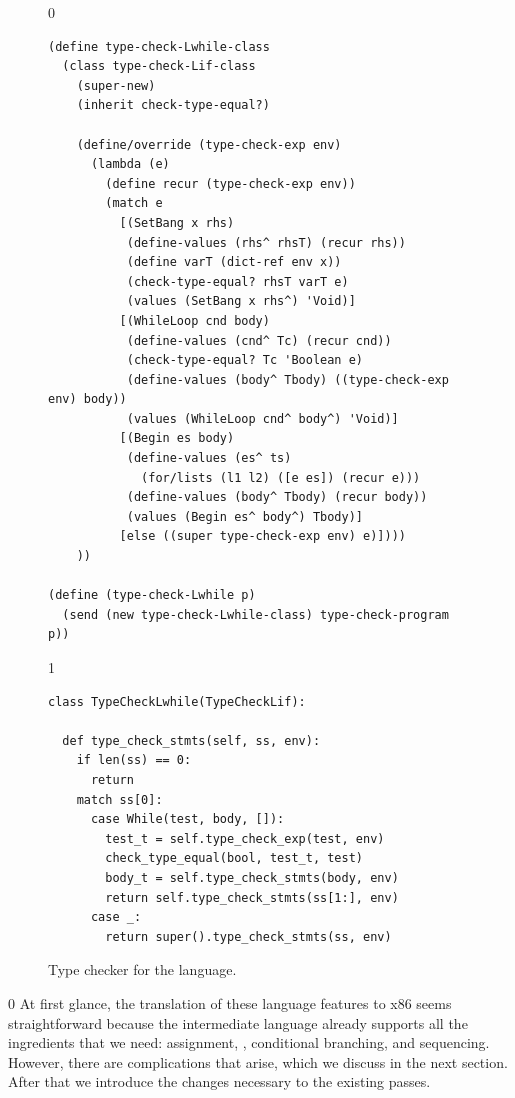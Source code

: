 \documentclass[7x10]{TimesAPriori_MIT}%
\def\racketEd{0}
\def\pythonEd{1}
\def\edition{1}
\newcommand{\pythonColor}[0]{}
\numberwithin{theorem}{chapter}
\numberwithin{definition}{chapter}
\numberwithin{equation}{chapter}
\begin{document}
\begin{figure}[tbp]
\begin{tcolorbox}[colback=white]  
{\if\edition\racketEd    
\begin{lstlisting}[basicstyle=\ttfamily\footnotesize]
(define type-check-Lwhile-class
  (class type-check-Lif-class
    (super-new)
    (inherit check-type-equal?)

    (define/override (type-check-exp env)
      (lambda (e)
        (define recur (type-check-exp env))
        (match e
          [(SetBang x rhs)
           (define-values (rhs^ rhsT) (recur rhs))
           (define varT (dict-ref env x))
           (check-type-equal? rhsT varT e)
           (values (SetBang x rhs^) 'Void)]
          [(WhileLoop cnd body)
           (define-values (cnd^ Tc) (recur cnd))
           (check-type-equal? Tc 'Boolean e)
           (define-values (body^ Tbody) ((type-check-exp env) body))
           (values (WhileLoop cnd^ body^) 'Void)]
          [(Begin es body)
           (define-values (es^ ts)
             (for/lists (l1 l2) ([e es]) (recur e)))
           (define-values (body^ Tbody) (recur body))
           (values (Begin es^ body^) Tbody)]
          [else ((super type-check-exp env) e)])))
    ))

(define (type-check-Lwhile p)
  (send (new type-check-Lwhile-class) type-check-program p))
\end{lstlisting}
\fi}
{\if\edition\pythonEd\pythonColor
\begin{lstlisting}
class TypeCheckLwhile(TypeCheckLif):

  def type_check_stmts(self, ss, env):
    if len(ss) == 0:
      return
    match ss[0]:
      case While(test, body, []):
        test_t = self.type_check_exp(test, env)
        check_type_equal(bool, test_t, test)
        body_t = self.type_check_stmts(body, env)
        return self.type_check_stmts(ss[1:], env)
      case _:
        return super().type_check_stmts(ss, env)
\end{lstlisting}
\fi}
\end{tcolorbox}

\caption{Type checker for the \LangLoop{} language.}
\label{fig:type-check-Lwhile}
\end{figure}


{\if\edition\racketEd    
%  
At first glance, the translation of these language features to x86
seems straightforward because the \LangCIf{} intermediate language
already supports all the ingredients that we need: assignment,
, conditional branching, and sequencing. However, there are
complications that arise, which we discuss in the next section. After
that we introduce the changes necessary to the existing passes.
%
\fi}
\end{document}
